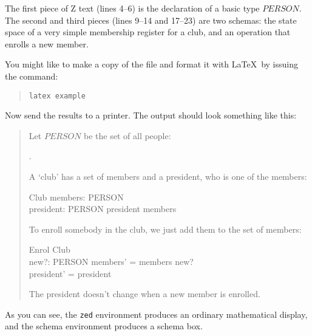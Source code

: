 The first piece of Z text (lines 4--6) is the declaration of a
basic type $PERSON$. The second and third pieces (lines 9--14 and
17--23) are two schemas: the state space of a very simple membership
register for a club, and an operation that enrolls a new member.

You might like to make a copy of the file and format it with \LaTeX\
by issuing the command:
\begin{quote}
        \verb/latex example/
\end{quote}
Now send the results to a printer. The output should look something
like this:
\begin{quote}
\small
Let $PERSON$ be the set of all people:
\begin{zed}
        [PERSON].
\end{zed}
A `club' has a set of members and a president, who is one of
the members:
\begin{schema}{Club}
        members: \power PERSON \\
        president: PERSON
\where
        president \subseteq members
\end{schema}
To enroll somebody in the club, we just add them to the set of
members:
\begin{schema}{Enrol}
        \Delta Club \\
        new?: PERSON
\where
        members' = members \cup new? \\
        president' = president
\end{schema}
The president doesn't change when a new member is enrolled.
\end{quote}
As you can see, the \verb/zed/ environment produces an ordinary
mathematical display, and the schema environment produces a schema box.

